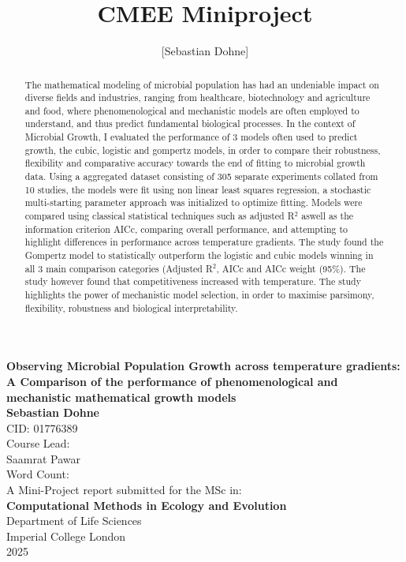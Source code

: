 \documentclass[11pt]{article}
\title{CMEE Miniproject}
\author{[Sebastian Dohne]}
\date{}
\begin{document}
\begin{titlepage}
    \begin{center}
    \vspace{1.75cm}
    \Large
        \textbf{Observing Microbial Population Growth across temperature gradients: A Comparison of the performance of phenomenological and mechanistic mathematical growth models }
        \vspace{2.5cm}\\
        \textbf{Sebastian Dohne}\\
        CID: 01776389\\
        \vspace{1.5cm}
        \large
        Course Lead:\\
        Saamrat Pawar\\
        \vspace{1.5cm}
        Word Count:  \\
        \vspace{4cm}
        A Mini-Project report submitted for the MSc in:\\ \textbf{Computational Methods in Ecology and Evolution}\\
        \vspace{1.5cm}
        Department of Life Sciences\\
        Imperial College London\\
        2025
    \end{center}
\end{titlepage}

\begin{abstract}
The mathematical modeling of microbial population has had an undeniable impact on diverse fields and industries, ranging from healthcare, biotechnology and agriculture and food, where phenomenological and mechanistic models are often employed to understand, and thus predict fundamental biological processes. In the context of Microbial Growth, I evaluated the performance of 3 models often used to predict growth, the cubic, logistic and gompertz models, in order to compare their robustness, flexibility and comparative accuracy towards the end of fitting to microbial growth data. Using a aggregated dataset consisting of 305 separate experiments collated from 10 studies, the models were fit using non linear least squares regression, a stochastic multi-starting parameter approach was initialized to optimize fitting. Models were compared using classical statistical techniques such as adjusted R$^2$ aswell as the information criterion AICc, comparing overall performance, and attempting to highlight differences in performance across temperature gradients. The study found the Gompertz model to statistically outperform the logistic and cubic models winning in all 3 main comparison categories (Adjusted R$^2$, AICc and AICc weight (95\%). The study however found that competitiveness increased with temperature. The study highlights the power of mechanistic model selection, in order to maximise parsimony, flexibility, robustness and biological interpretability.    
\end{abstract}
\end{document}
